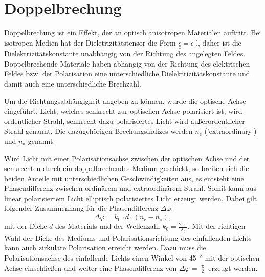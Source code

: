 \section{Doppelbrechung}

Doppelbrechung ist ein Effekt, der an optisch anisotropen Materialen auftritt.
Bei isotropen Medien hat der Dieletrizitätstensor die Form $\underline{\underline{\epsilon}} = \epsilon \; \mathbb{I}$, daher ist die Dielektrizitätskonstante unabhängig von der Richtung des angelegten Feldes.
Doppelbrechende Materiale haben abhängig von der Richtung des elektrischen Feldes bzw. der Polarisation eine unterschiedliche Dielektrizitätskonstante und damit auch eine unterschiedliche Brechzahl.

Um die Richtungsabhängigkeit angeben zu können, wurde die optische Achse eingeführt.
Licht, welches senkrecht zur optischen Achse polarisiert ist, wird ordentlicher Strahl, senkrecht dazu polarisiertes Licht wird außerordentlicher Strahl genannt.
Die dazugehörigen Brechungsindizes werden $n_\text{e}$ ('extraordinary') und $n_\text{a}$ genannt.

Wird Licht mit einer Polarisationsachse zwischen der optischen Achse und der senkrechten durch ein doppelbrechendes Medium geschickt, so breiten sich die beiden Anteile mit unterschiedlichen Geschwindigkeiten aus, es entsteht eine Phasendifferenz zwischen ordinärem und extraordinärem Strahl.
Somit kann aus linear polarisiertem Licht elliptisch polarisiertes Licht erzeugt werden.
Dabei gilt folgender Zusammenhang für die Phasendifferenz $\Delta \varphi$:
\begin{equation} \label{eq:phasediff}
	\Delta \varphi = k_0 \cdot d \cdot \left(n_\text{e} - n_\text{o}\right),
\end{equation}
mit der Dicke $d$ des Materials und der Wellenzahl $k_0 = \frac{2 \uppi}{\lambda_0}$.
Mit der richtigen Wahl der Dicke des Mediums und Polarisationsrichtung des einfallenden Lichts kann auch zirkulare Polarisation erreicht werden.
Dazu muss die Polarisationsachse des einfallende Lichts einen Winkel von \SI{45}{\degree} mit der optischen Achse einschließen und weiter eine Phasendifferenz von $\Delta \varphi = \frac{\uppi}{2}$ erzeugt werden.
